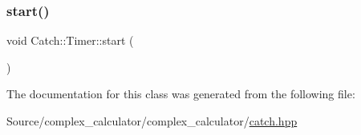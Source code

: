 \subsubsection{\texorpdfstring{start()}{start()}}
{\footnotesize\ttfamily void Catch\+::\+Timer\+::start (\begin{DoxyParamCaption}{ }\end{DoxyParamCaption})}



The documentation for this class was generated from the following file\+:\begin{DoxyCompactItemize}
\item 
Source/complex\+\_\+calculator/complex\+\_\+calculator/\mbox{\hyperlink{catch_8hpp}{catch.\+hpp}}\end{DoxyCompactItemize}
